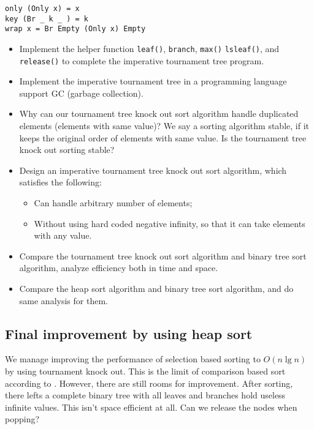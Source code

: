 \documentclass{article}
\begin{document}
\lstset{language=Haskell}
\begin{lstlisting}
only (Only x) = x
key (Br _ k _ ) = k
wrap x = Br Empty (Only x) Empty
\end{lstlisting}

\begin{Exercise}
  \begin{itemize}
    \item Implement the helper function \texttt{leaf()}, \texttt{branch}, \texttt{max()} \texttt{lsleaf()}, and \texttt{release()} to complete the imperative tournament tree program.
    \item Implement the imperative tournament tree in a programming language support GC (garbage collection).
    \item Why can our tournament tree knock out sort algorithm handle duplicated elements (elements with same value)? We say a sorting algorithm stable, if it keeps the original order of elements with same value. Is the tournament tree knock out sorting stable?
    \item Design an imperative tournament tree knock out sort algorithm, which satisfies the following:
      \begin{itemize}
        \item Can handle arbitrary number of elements;
        \item Without using hard coded negative infinity, so that it can take elements with any value.
      \end{itemize}
    \item Compare the tournament tree knock out sort algorithm and binary tree sort algorithm, analyze efficiency both in time and space.
    \item Compare the heap sort algorithm and binary tree sort algorithm, and do same analysis for them.
  \end{itemize}
\end{Exercise}

\subsection{Final improvement by using heap sort}

We manage improving the performance of selection based sorting to $O(n \lg n)$ by using tournament knock out.
This is the limit of comparison based sort according to \cite{TAOCP}. However, there are still rooms for improvement.
After sorting, there lefts a complete binary tree with all leaves and branches hold useless infinite values.
This isn't space efficient at all. Can we release the nodes when popping?
\end{document}
